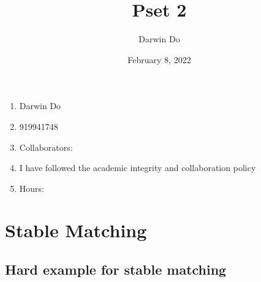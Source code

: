 \documentclass{article}
\title{Pset 2}
\begin{document}
\date{February 8, 2022 }
\author{Darwin Do}

\maketitle

\begin{enumerate}[label=(\alph*)]
    \item Darwin Do
    \item 919941748
    \item Collaborators: 
    \item I have followed the academic integrity and collaboration policy
    \item Hours: 
\end{enumerate}

\newpage

\section{Stable Matching}
\subsection{Hard example for stable matching}
\end{document}
